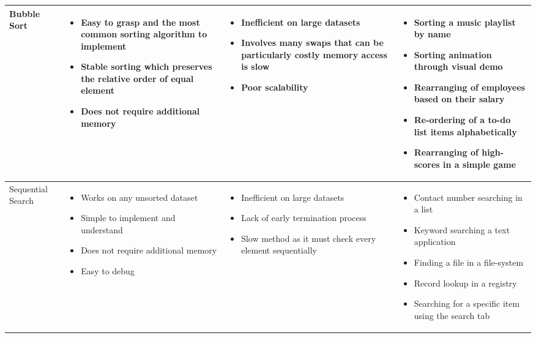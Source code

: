 \documentclass{article}
\begin{document}
\begin{longtable}{|p{2.5cm}|p{4.3cm}|p{4.3cm}|p{}|}
Bubble Sort &
\begin{itemize}
\itemindent=-13pt
\item Easy to grasp and the most common sorting algorithm to implement
\item Stable sorting which preserves the relative order of equal element 
\item Does not require additional memory  
\end{itemize}
&
\begin{itemize}
\itemindent=-13pt
\item Inefficient on large datasets 
\item Involves many swaps that can be particularly costly memory access is slow 
\item Poor scalability  
\end{itemize}
&
\begin{itemize}
\itemindent=-13pt
\item Sorting a music playlist by name 
\item Sorting animation through visual demo 
\item Rearranging of employees based on their salary 
\item Re-ordering of a to-do list items alphabetically 
\item Rearranging of high-scores in a simple game
\end{itemize}
\\
\hline

Sequential Search &
\begin{itemize}
\itemindent=-13pt
\item Works on any unsorted dataset 
\item Simple to implement and understand
\item Does not require additional memory 
\item Easy to debug
\end{itemize}
&
\begin{itemize}
\itemindent=-13pt
\item Inefficient on large datasets
\item Lack of early termination process 
\item Slow method as it must check every element sequentially
\end{itemize}
&
\begin{itemize}
\itemindent=-13pt
\item Contact number searching in a list 
\item Keyword searching a text application 
\item Finding a file in a file-system 
\item Record lookup in a registry
\item Searching for a specific item using the search tab
\end{itemize}
\\
\hline


\end{longtable}
\end{document}
